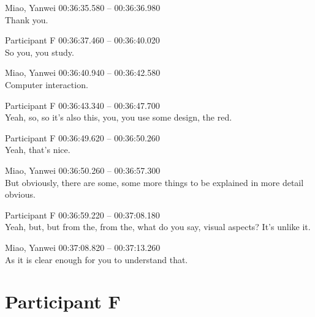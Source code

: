 {Miao, Yanwei 00:36:35.580 -- 00:36:36.980 \\
Thank you.

Participant F 00:36:37.460 -- 00:36:40.020 \\
So you, you study.

Miao, Yanwei 00:36:40.940 -- 00:36:42.580 \\
Computer interaction.

Participant F 00:36:43.340 -- 00:36:47.700 \\
Yeah, so, so it's also this, you, you use some design, the red.

Participant F 00:36:49.620 -- 00:36:50.260 \\
Yeah, that's nice.

Miao, Yanwei 00:36:50.260 -- 00:36:57.300 \\
But obviously, there are some, some more things to be explained in more detail obvious.

Participant F 00:36:59.220 -- 00:37:08.180 \\
Yeah, but, but from the, from the, what do you say, visual aspects? It's unlike it.

Miao, Yanwei 00:37:08.820 -- 00:37:13.260 \\
As it is clear enough for you to understand that.
}


\section*{Participant F}

